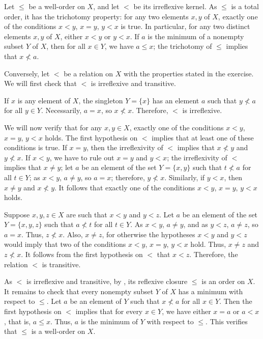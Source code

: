 \documentclass{article}
\begin{document}
Let \(\leq\) be a well-order on \(X\), and let \(<\) be its
irreflexive kernel.  As \(\leq\) is a total order, it has the
trichotomy property: for any two elements \(x, y\) of \(X\), exactly
one of the conditions \(x < y\), \(x = y\), \(y < x\) is true.  In
particular, for any two distinct elements \(x, y\) of \(X\), either
\(x < y\) or \(y < x\).  If \(a\) is the minimum of a nonempty subset
\(Y\) of \(X\), then for all \(x \in Y\), we have \(a \leq x\); the
trichotomy of \(\leq\) implies that \(x \nless a\).

Conversely, let \(<\) be a relation on \(X\) with the properties
stated in the exercise.  We will first check that \(<\) is irreflexive
and transitive.

If \(x\) is any element of \(X\), the singleton \(Y = \{ x \}\) has an
element \(a\) such that \(y \nless a\) for all \(y \in Y\).
Necessarily, \(a = x\), so \(x \nless x\).  Therefore, \(<\) is
irreflexive.

We will now verify that for any \(x, y \in X\), exactly one of the
conditions \(x < y\), \(x = y\), \(y < x\) holds.  The first
hypothesis on \(<\) implies that at least one of these conditions is
true.  If \(x = y\), then the irreflexivity of \(<\) implies that
\(x \nless y\) and \(y \nless x\).  If \(x < y\), we have to rule out
\(x = y\) and \(y < x\); the irreflexivity of \(<\) implies that
\(x \neq y\); let \(a\) be an element of the set \(Y = \{ x, y \}\)
such that \(t \nless a\) for all \(t \in Y\); as \(x < y\),
\(a \neq y\), so \(a = x\); therefore, \(y \nless x\).  Similarly, if
\(y < x\), then \(x \neq y\) and \(x \nless y\).  It follows that
exactly one of the conditions \(x < y\), \(x = y\), \(y < x\) holds.

Suppose \(x, y, z \in X\) are such that \(x < y\) and \(y < z\).  Let
\(a\) be an element of the set \(Y = \{ x, y, z \}\) such that
\(a \nless t\) for all \(t \in Y\).  As \(x < y\), \(a \neq y\), and
as \(y < z\), \(a \neq z\), so \(a = x\).  Thus, \(z \nless x\).
Also, \(x \neq z\), for otherwise the hypotheses \(x < y\) and
\(y < z\) would imply that two of the conditions \(x < y\), \(x = y\),
\(y < x\) hold.  Thus, \(x \neq z\) and \(z \nless x\).  It follows
from the first hypothesis on \(<\) that \(x < z\).  Therefore, the
relation \(<\) is transitive.

As \(<\) is irreflexive and transitive, by , its
reflexive closure \(\leq\) is an order on \(X\).  It remains to check
that every nonempty subset \(Y\) of \(X\) has a minimum with respect
to \(\leq\).  Let \(a\) be an element of \(Y\) such that
\(x \nless a\) for all \(x \in Y\).  Then the first hypothesis on
\(<\) implies that for every \(x \in Y\), we have either \(x = a\) or
\(a < x\), that is, \(a \leq x\).  Thus, \(a\) is the minimum of \(Y\)
with respect to \(\leq\).  This verifies that \(\leq\) is a well-order
on \(X\).
\end{document}
